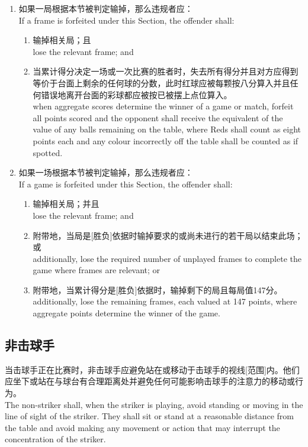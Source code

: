 \begin{enumerate}[label=(\alph*)]
    \item 如果一局根据本节被判定输掉，那么违规者应：\\
    If a frame is forfeited under this Section, the offender shall:
    \begin{enumerate}[label=(\roman*)]
        \item 输掉相关局；且\\
        lose the relevant frame; and
        \item 当累计得分决定一场或一次比赛的胜者时，失去所有得分并且对方应得到等价于台面上剩余的任何球的分数，此时红球应被每颗按八分算入并且任何错误地离开台面的彩球都应被按已被摆上点位算入。\\
        when aggregate scores determine the winner of a game or match, forfeit all points scored and the opponent shall receive the equivalent of the value of any balls remaining on the table, where Reds shall count as eight points each and any colour incorrectly off the table shall be counted as if spotted.
    \end{enumerate}
    \item 如果一场根据本节被判定输掉，那么违规者应：\\
    If a game is forfeited under this Section, the offender shall:
    \begin{enumerate}[label=(\roman*)]
        \item 输掉相关局；并且\\
        lose the relevant frame; and
        \item 附带地，当局是[胜负]依据时输掉要求的或尚未进行的若干局以结束此场；或\\
        additionally, lose the required number of unplayed frames to complete the game where frames are relevant; or
        \item 附带地，当累计得分是[胜负]依据时，输掉剩下的局且每局值147分。\\
        additionally, lose the remaining frames, each valued at 147 points, where aggregate points determine the winner of the game.
    \end{enumerate}
\end{enumerate}

\subsection{非击球手}

\noindent 当击球手正在比赛时，非击球手应避免站在或移动于击球手的视线[范围]内。他们应坐下或站在与球台有合理距离处并避免任何可能影响击球手的注意力的移动或行为。\\
The non-striker shall, when the striker is playing, avoid standing or moving in the line of sight of the striker. They shall sit or stand at a reasonable distance from the table and avoid making any movement or action that may interrupt the concentration of the striker.

